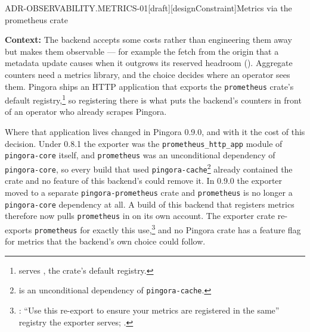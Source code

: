 \begin{requirement}{ADR-OBSERVABILITY.METRICS-01}[draft][designConstraint]{Metrics via the prometheus crate}


  \textbf{Context:} The backend accepts some costs rather than engineering
  them away but makes them observable --- for example the fetch from the
  origin that a metadata update causes when it outgrows its reserved
  headroom (). Aggregate counters need a metrics
  library, and the choice decides where an operator sees them. Pingora ships an
  HTTP application that exports the \texttt{prometheus} crate's default
  registry,\footnote{
  serves ,
  the crate's default registry.} so registering there is what puts the backend's
  counters in front of an operator who already scrapes Pingora.

  Where that application lives changed in Pingora 0.9.0, and with it the cost of
  this decision. Under 0.8.1 the exporter was the
  \texttt{prometheus\_http\_app} module of \texttt{pingora-core} itself, and \texttt{prometheus} was an
  unconditional dependency of \texttt{pingora-core}, so every build that used
  \texttt{pingora-cache}\footnote{
  is an unconditional dependency of \texttt{pingora-cache}.} already contained
  the crate and no feature of this backend's could remove it. In 0.9.0 the
  exporter moved to a separate \texttt{pingora-prometheus} crate and
  \texttt{prometheus} is no longer a \texttt{pingora-core} dependency at all.
  A build of this backend that registers metrics therefore now pulls
  \texttt{prometheus} in on its own account. The exporter crate re-exports
  \texttt{prometheus} for exactly this use,\footnote{: ``Use this re-export to ensure your
  metrics are registered in the same'' registry the exporter serves;
  .}
  and no Pingora crate has a feature flag for metrics that the backend's
  own choice could follow.


\end{requirement}
